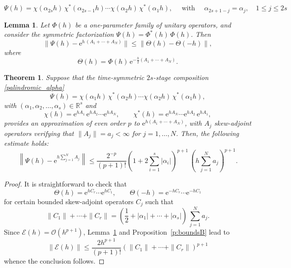 \documentclass[10pt,a4paper]{amsart}
\newtheorem{lemma}{Lemma}
\newtheorem{theorem}{Theorem}
\newcommand{\e}{\ensuremath{\mathrm{e}}}
\begin{document}
\begin{equation} \label{palindromic_alpha}
  \Psi(h) = \chi(\alpha_{2s} h) \, \chi^*(\alpha_{2s-1} h) \cdots \chi(\alpha_2 h) \, \chi^*(\alpha_1 h), 
     \quad \mbox{ with } \quad \alpha_{2s+1-j} = \alpha_j, \quad 1 \leq j \leq 2s
\end{equation}

\begin{lemma} \label{l:Theta}
Let  $\Phi(h)$ be a one-parameter family of unitary operators, and consider the symmetric factorization $\Psi(h) = \Phi^*(h) \, \Phi(h)$.
Then
\begin{equation*}
\|\Psi(h) - \e^{h\,  (A_1+\cdots+A_N)}\| \leq \| \Theta(h) - \Theta(-h)\|,
\end{equation*}
where
\begin{equation} \label{eq:Theta}
\Theta(h) = \Phi(h) \, \e^{-\frac{h}{2}  (A_1+\cdots+A_N)}.
\end{equation}
\end{lemma}

\begin{theorem} \label{th_compo}
Suppose that the time-symmetric $2s$-stage composition \eqref{palindromic_alpha} 
\[
   \Psi(h) = \chi(\alpha_{1} h) \, \chi^*(\alpha_{2} h) \cdots \chi(\alpha_2 h) \, \chi^*(\alpha_1 h), 
\]
with $(\alpha_1, \alpha_2, \ldots, \alpha_s) \in \mathbb{R}^s$ and
\[
  \chi(h) = \e^{h A_1} \, \e^{h A_2} \cdots \e^{h A_N}, \qquad \chi^*(h) = \e^{h A_N} \cdots \e^{h A_2} \, \e^{h A_1}, 
\]
 provides an approximation of even order $p$ to $\e^{h(A_1 + \cdots + A_N)}$,
with $A_j$ skew-adjoint operators verifying that $\|A_j\| = a_j < \infty$ for $j=1,\ldots, N$. Then, the following estimate holds:
\begin{equation*} 
  \left\|\Psi(h)-\e^{h \sum_{j=1}^N A_j} \right\| \le \frac{2^{-p}}{(p+1)!} \left( 1+ 2 \sum_{i=1}^s |\alpha_i| \right)^{p+1}  \, \left(h \sum_{j=1}^N a_j \right)^{p+1}.
\end{equation*}
\end{theorem}

\begin{proof}
It is straightforward to check that 
\[
\Theta(h)=\e^{h C_r} \cdots \e^{h C_1}, \qquad 
\Theta(-h) = \e^{-h C_r} \cdots \e^{-h C_1}
\]
 for certain bounded skew-adjoint operators $C_j$ such that 
\begin{equation*}
\|C_1\|+\cdots+\|C_r\|  = \left( \frac{1}{2} + |\alpha_1|+\cdots+|\alpha_s| \right) \, \sum_{j=1}^N a_j.
\end{equation*}
Since $\mathcal{E}(h) = \mathcal{O}(h^{p+1})$, Lemma~\ref{l:Theta} and Proposition~\ref{p:boundsB} lead to
\[
  \|\mathcal{E}(h)\| \le  \frac{2 h^{p+1}}{(p+1)!} \left( \|C_1\|+\cdots+\|C_r\| \right)^{p+1}
 \]
 whence the conclusion follows. 
\end{proof}
\end{document}
